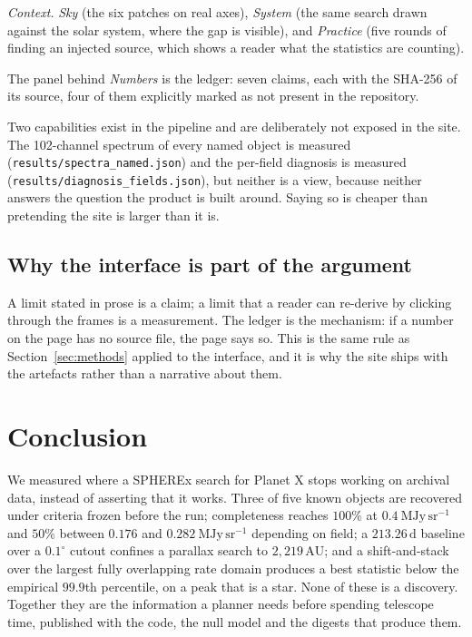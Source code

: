 \documentclass[11pt,a4paper]{article}
\newcommand{\unit}[1]{\,\mathrm{#1}}
\newcommand{\mjysr}{\ \mathrm{MJy\,sr^{-1}}}
\newcommand{\au}{\unit{AU}}
\newcommand{\code}[1]{\texttt{#1}}
\begin{document}
\emph{Context.} \emph{Sky} (the six patches on real axes), \emph{System} (the same
search drawn against the solar system, where the gap is visible), and
\emph{Practice} (five rounds of finding an injected source, which shows a reader
what the statistics are counting).

The panel behind \emph{Numbers} is the ledger: seven claims, each with the
SHA-256 of its source, four of them explicitly marked as not present in the
repository.

Two capabilities exist in the pipeline and are deliberately not exposed in the
site. The 102-channel spectrum of every named object is measured
(\code{results/spectra\_named.json}) and the per-field diagnosis is measured
(\code{results/diagnosis\_fields.json}), but neither is a view, because neither
answers the question the product is built around. Saying so is cheaper than
pretending the site is larger than it is.

\subsection{Why the interface is part of the argument}
A limit stated in prose is a claim; a limit that a reader can re-derive by clicking
through the frames is a measurement. The ledger is the mechanism: if a number on
the page has no source file, the page says so. This is the same rule as
Section~\ref{sec:methods} applied to the interface, and it is why the site ships
with the artefacts rather than a narrative about them.

\section{Conclusion}\label{sec:conclusion}
We measured where a SPHEREx search for Planet X stops working on archival data,
instead of asserting that it works. Three of five known objects are recovered
under criteria frozen before the run; completeness reaches $100\%$ at
$0.4\mjysr$ and $50\%$ between $0.176$ and $0.282\mjysr$ depending on field; a
$213.26\unit{d}$ baseline over a $0.1^{\circ}$ cutout confines a parallax search
to $2{,}219\au$; and a shift-and-stack over the largest fully overlapping rate
domain produces a best statistic below the empirical $99.9$th percentile, on a
peak that is a star. None of these is a discovery. Together they are the
information a planner needs before spending telescope time, published with the
code, the null model and the digests that produce them.
\end{document}
